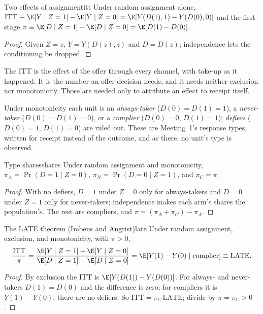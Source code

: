 \documentclass[11pt]{article}
\begin{document}
\begin{prop}{Two effects of assignment}{itt}
Under random assignment alone, $\text{ITT} \equiv \E[Y \mid Z=1] - \E[Y \mid Z=0] = \E[Y(D(1),1) - Y(D(0),0)]$ and
the first stage $\pi \equiv \E[D \mid Z=1] - \E[D \mid Z=0] = \E[D(1) - D(0)]$.
\end{prop}
\begin{proof}
Given $Z = z$, $Y = Y(D(z), z)$ and $D = D(z)$; independence lets the conditioning be dropped.
\end{proof}

The ITT is the effect of the offer through every channel, with take-up as it happened. It is the number an
offer decision needs, and it needs neither exclusion nor monotonicity. Those are needed only to attribute an
effect to receipt itself.

Under monotonicity each unit is an \emph{always-taker} ($D(0) = D(1) = 1$), a \emph{never-taker}
($D(0) = D(1) = 0$), or a \emph{complier} ($D(0) = 0$, $D(1) = 1$); \emph{defiers} ($D(0) = 1$, $D(1) = 0$) are
ruled out. These are Meeting~1's response types, written for receipt instead of the outcome, and as there, no
unit's type is observed.

\begin{prop}{Type shares}{shares}
Under random assignment and monotonicity, $\pi_A = \Pr(D=1 \mid Z=0)$, $\pi_N = \Pr(D=0 \mid Z=1)$, and
$\pi_C = \pi$.
\end{prop}
\begin{proof}
With no defiers, $D = 1$ under $Z = 0$ only for always-takers and $D = 0$ under $Z = 1$ only for never-takers;
independence makes each arm's shares the population's. The rest are compliers, and $\pi = (\pi_A + \pi_C) - \pi_A$.
\end{proof}

\begin{prop}{The LATE theorem (Imbens and Angrist)}{late}
Under random assignment, exclusion, and monotonicity, with $\pi > 0$,
\[
  \frac{\text{ITT}}{\pi} = \frac{\E[Y \mid Z=1] - \E[Y \mid Z=0]}{\E[D \mid Z=1] - \E[D \mid Z=0]}
  = \E[Y(1) - Y(0) \mid \text{complier}] \equiv \text{LATE}.
\]
\end{prop}
\begin{proof}
By exclusion the ITT is $\E[Y(D(1)) - Y(D(0))]$. For always- and never-takers $D(1) = D(0)$ and the difference
is zero; for compliers it is $Y(1) - Y(0)$; there are no defiers. So $\text{ITT} = \pi_C\,\text{LATE}$; divide by
$\pi = \pi_C > 0$.
\end{proof}
\end{document}
